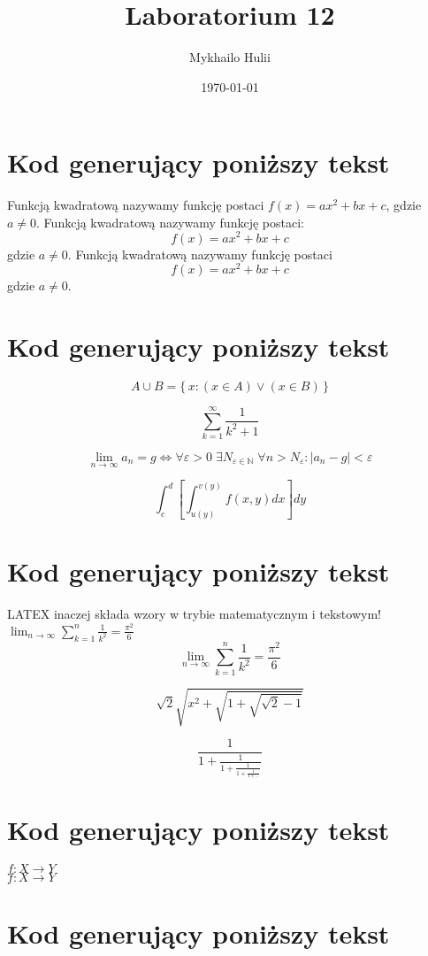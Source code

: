 \documentclass[a4paper,12pt]{article}
\title{Laboratorium 12}
\author{Mykhailo Hulii}
\date{\today}
\begin{document}
	
	
	\maketitle 
	
	\section{Kod generujący poniższy tekst}
	
	Funkcją kwadratową nazywamy funkcję postaci $f(x)=ax^2+bx+c$, gdzie $a \neq 0$. Funkcją kwadratową nazywamy funkcję postaci:
	$$f(x)=ax^2+bx+c$$
	gdzie $a \neq 0$.
	Funkcją kwadratową nazywamy funkcję postaci
	$$f(x)=ax^2+bx+c$$
	gdzie $a \neq 0$.
	
	\section{Kod generujący poniższy tekst}
	$$A \cup B = \{\, x \colon (x \in A) \vee (x \in B)\,\}$$
	
	$$\sum_{k=1}^{\infty}\frac{1}{k^2+1}$$
	
	$$\lim_{n \to \infty} a_{n} = g \Leftrightarrow
	\forall \varepsilon > 0 \; \exists N_{\varepsilon
		\in \mathbb{N}} \; \forall n > N_{\varepsilon} \colon
	\left| {a_{n} - g} \right| < \varepsilon $$
	
	$$\int_{c}^{d} \left[ \int_{u(y)}^{v(y)} f(x,y)dx \right] dy$$
	
	\section{Kod generujący poniższy tekst}
	LATEX inaczej składa wzory w trybie matematycznym i tekstowym!$\lim_{n \to \infty} \sum_{k = 1}^n \frac{1}{k^2} =
	\frac{\pi^2}{6}$
	$$\lim_{n \to \infty} \sum_{k = 1}^n \frac{1}{k^2} =
	\frac{\pi^2}{6}$$
	
	$$\sqrt{2}\sqrt{x^2 + \sqrt{1 + \sqrt{\sqrt{2}-1}}}$$
	
	$$\frac{1}{1 + \frac{1}{1 + \frac{1}{1 +
				\frac{1}{1 + \dots}}}}$$
	
	
	\section{Kod generujący poniższy tekst}
	
	$f\colon X \to Y$\\ $f : X \to Y$
	
	
	
	
	\section{Kod generujący poniższy tekst}
	
\end{document}
